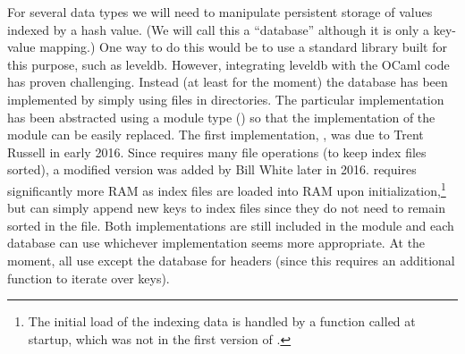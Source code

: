 For several data types we will need to manipulate persistent storage of values 
indexed by a hash value. (We will call this a ``database'' although 
it is only a key-value mapping.)
One way to do this would be to use a standard library built for this purpose,
such as leveldb.
However, integrating leveldb with the OCaml code has proven challenging.
Instead (at least for the moment) the database has been implemented
by simply using files in directories.
The particular implementation has been abstracted using a module type ({})
so that the implementation of the module can be easily replaced.
The first implementation, {}, was due to Trent Russell in early 2016.
Since {} requires many file operations (to keep index files sorted),
a modified version {} was added by Bill White later in 2016.
{} requires significantly more RAM as index files are loaded into RAM
upon initialization,\footnote{The initial load of the indexing data is handled by a function {} called at startup, which was not in the first version of {}.}
but can simply append new keys to index files since they do not need to
remain sorted in the file.
Both implementations are still included in the {} module
and each database can use whichever implementation seems more appropriate.
At the moment, all use {} except the database for headers (since this requires
an additional function to iterate over keys).


